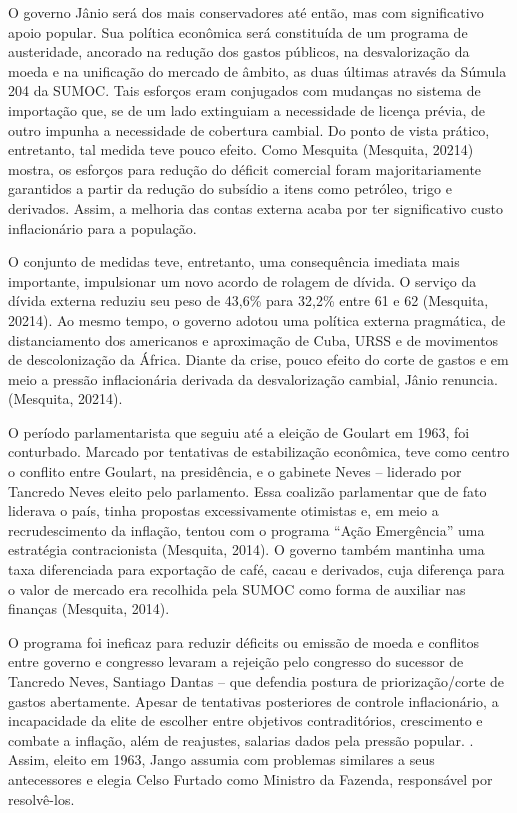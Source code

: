 O governo Jânio será dos mais conservadores até então, mas com significativo
apoio popular. Sua política econômica será constituída de um programa
de austeridade, ancorado na redução dos gastos públicos, na desvalorização da moeda
e na unificação do mercado de âmbito, as duas últimas através da Súmula 204 da SUMOC\citep{villela_dos_2025}.
Tais esforços eram conjugados com mudanças no sistema de importação que, se de um lado extinguiam
a necessidade  de licença prévia, de outro impunha a necessidade de cobertura cambial. Do ponto de
vista prático, entretanto, tal medida teve pouco efeito.
Como Mesquita (Mesquita, 20214) mostra, os esforços para redução do déficit comercial foram majoritariamente
garantidos a partir da redução do subsídio a itens como petróleo, trigo e derivados. Assim,
a melhoria das contas externa acaba por ter significativo custo inflacionário para a 
população.

O conjunto de medidas teve, entretanto, uma consequência imediata mais importante, impulsionar 
um novo acordo de rolagem de dívida. O serviço da dívida externa reduziu seu 
peso de 43,6\% para 32,2\% entre 61 e 62 (Mesquita, 20214). 
Ao mesmo tempo, o governo adotou uma política externa pragmática, de
distanciamento dos americanos e aproximação de Cuba, URSS e de
movimentos de descolonização da África. Diante da crise, pouco efeito do
corte de gastos e em meio a pressão inflacionária derivada da
desvalorização cambial, Jânio renuncia. (Mesquita, 20214).

O período parlamentarista que seguiu até a eleição de Goulart em 1963, foi conturbado.
Marcado por tentativas de estabilização econômica, teve como centro o conflito
entre Goulart, na presidência, e o gabinete Neves -- liderado por Tancredo Neves
eleito pelo parlamento. Essa coalizão parlamentar que de fato liderava o país, tinha propostas
excessivamente otimistas e, em meio a recrudescimento da
inflação, tentou com o programa ``Ação Emergência'' uma estratégia
contracionista (Mesquita, 2014). O governo também mantinha uma taxa diferenciada
para exportação de café, cacau e derivados, cuja diferença para o valor de mercado
era recolhida pela SUMOC como forma de auxiliar nas finanças (Mesquita, 2014).

O programa foi ineficaz para reduzir déficits ou emissão
de moeda e conflitos entre governo e congresso levaram a rejeição pelo
congresso do sucessor de Tancredo Neves, Santiago Dantas -- que defendia
postura de priorização/corte de gastos abertamente. Apesar de
tentativas posteriores de controle inflacionário, a incapacidade da
elite de escolher entre objetivos contraditórios, crescimento e combate
a inflação, além de reajustes, salarias dados pela pressão popular.
\citep[]{mesquita_inflacao_2014}. Assim, eleito em 1963, Jango assumia com problemas similares
a seus antecessores e elegia Celso Furtado como Ministro da Fazenda, responsável
por resolvê-los.

